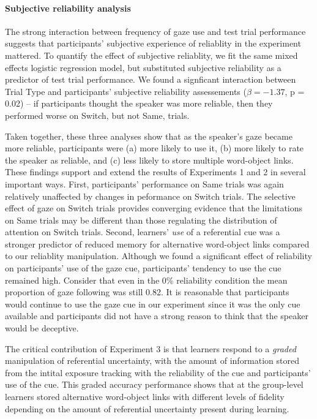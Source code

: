 \documentclass[authoryear, review]{elsarticle}
\begin{document}
\paragraph{Subjective reliability
analysis}\label{subjective-reliability-analysis}

The strong interaction between frequency of gaze use and test trial
performance suggests that participants' subjective experience of
reliablity in the experiment mattered. To quantify the effect of
subjective reliablity, we fit the same mixed effects logistic regression
model, but substituted subjective reliability as a predictor of test
trial performance. We found a signficant interaction between Trial Type
and participants' subjective reliability assessements
(\(\beta = -1.37\), p = 0.02) -- if participants thought the speaker was
more reliable, then they performed worse on Switch, but not Same,
trials.

Taken together, these three analyses show that as the speaker's gaze
became more reliable, participants were (a) more likely to use it, (b)
more likely to rate the speaker as reliable, and (c) less likely to
store multiple word-object links. These findings support and extend the
results of Experiments 1 and 2 in several important ways. First,
participants' performance on Same trials was again relatively unaffected
by changes in peformance on Switch trials. The selective effect of gaze
on Switch trials provides converging evidence that the limitations on
Same trials may be different than those regulating the distribution of
attention on Switch trials. Second, learners' \emph{use} of a
referential cue was a stronger predictor of reduced memory for
alternative word-object links compared to our reliablity manipulation.
Although we found a significant effect of reliability on participants'
use of the gaze cue, participants' tendency to use the cue remained
high. Consider that even in the 0\% reliability condition the mean
proportion of gaze following was still 0.82. It is reasonable that
participants would continue to use the gaze cue in our experiment since
it was the only cue available and participants did not have a strong
reason to think that the speaker would be deceptive.

The critical contribution of Experiment 3 is that learners respond to a
\emph{graded} manipulation of referential uncertainty, with the amount
of information stored from the intital exposure tracking with the
reliability of the cue and participants' use of the cue. This graded
accuracy performance shows that at the group-level learners stored
alternative word-object links with different levels of fidelity
depending on the amount of referential uncertainty present during
learning.
\end{document}
